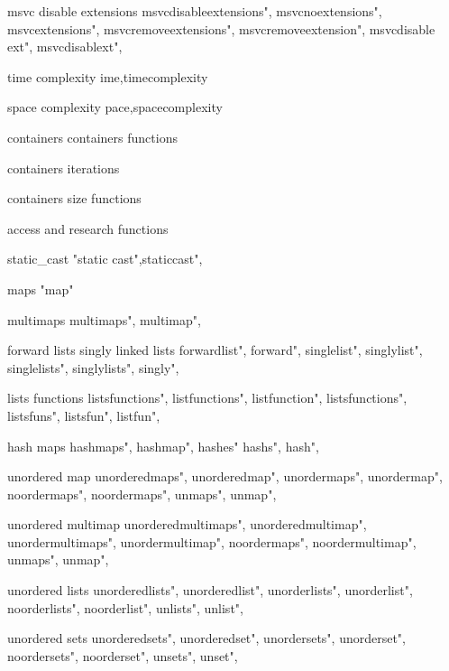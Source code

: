          msvc disable extensions 
        msvcdisableextensions", 
        msvcnoextensions", 
        msvcextensions", 
        msvcremoveextensions", 
        msvcremoveextension", 
        msvcdisable ext", 
        msvcdisablext", 

         time complexity
        ime,timecomplexity
        
         space complexity
        pace,spacecomplexity
        
         containers
         containers functions
        
         containers iterations
        
         containers size functions 
        
         access and research functions 
        
         static_cast 
         "static cast",staticcast",
        
         maps
         "map"
        
         multimaps
        multimaps", 
        multimap",
        
         forward lists singly linked lists
        forwardlist",  
        forward",  
        singlelist",  
        singlylist",  
        singlelists",  
        singlylists",  
        singly",  
        
         lists functions 
        listsfunctions",  
        listfunctions",  
        listfunction",  
        listsfunctions",  
        listsfuns",  
        listsfun",  
        listfun",  
         
         hash maps 
        hashmaps", 
        hashmap",
        hashes"
        hashs",
        hash",
        
         unordered map 
        unorderedmaps", 
        unorderedmap", 
        unordermaps", 
        unordermap", 
        noordermaps", 
        noordermaps", 
        unmaps", 
        unmap", 
         
         unordered multimap 
        unorderedmultimaps", 
        unorderedmultimap", 
        unordermultimaps", 
        unordermultimap", 
        noordermaps", 
        noordermultimap", 
        unmaps", 
        unmap", 
        
         unordered lists 
        unorderedlists", 
        unorderedlist", 
        unorderlists", 
        unorderlist", 
        noorderlists", 
        noorderlist", 
        unlists", 
        unlist", 
        
         unordered sets
        unorderedsets", 
        unorderedset", 
        unordersets", 
        unorderset", 
        noordersets", 
        noorderset", 
        unsets", 
        unset", 
        

